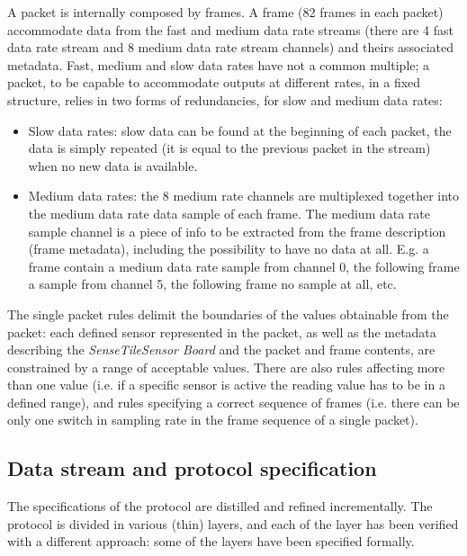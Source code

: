 \documentclass{article}
\newcommand{\ST}{\emph{SenseTile}\xspace}
\newcommand{\SB}{\emph{Sensor Board}\xspace}
\newcommand{\STSB}{\ST \SB\xspace}
\begin{document}
A packet is internally composed by frames. 
A frame (82 frames in each packet) accommodate data from the fast and medium data rate streams (there are 4 fast data rate stream and 8 medium data rate stream channels) and theirs associated metadata.
Fast, medium and slow data rates have not a common multiple; a packet, to be capable to accommodate outputs at different rates, in a fixed structure, relies in two forms of redundancies, for slow and medium data rates:
\begin{itemize}
\item Slow data rates: slow data can be found at the beginning of each packet, the data is simply repeated (it is equal to the previous packet in the stream) when no new data is available.
\item Medium data rates: the 8 medium rate channels are multiplexed together into the medium data rate data sample of each frame. The medium data rate sample channel is a piece of info to be extracted from the frame description (frame metadata), including the possibility to have no data at all. 
E.g. a frame contain a medium data rate sample from channel 0, the following frame a sample from channel 5, the following frame no sample at all, etc.
\end{itemize}

The single packet rules delimit the boundaries of the values obtainable from the packet: each defined sensor represented in the packet, as well as the metadata describing the \STSB and the packet and frame contents, are constrained by a range of acceptable values.
There are also rules affecting more than one value (i.e. if a specific sensor is active the reading value has to be in a defined range), and rules specifying a correct sequence of frames (i.e. there can be only one switch in sampling rate in the frame sequence of a single packet).



\subsection{Data stream and protocol specification}
\label{subsec:data_stream_and_protocol_specification}

The specifications of the protocol are distilled and refined incrementally.
The protocol is divided in various (thin) layers, and each of the layer has been verified with a different approach: some of the layers have been specified formally. 
\end{document}
